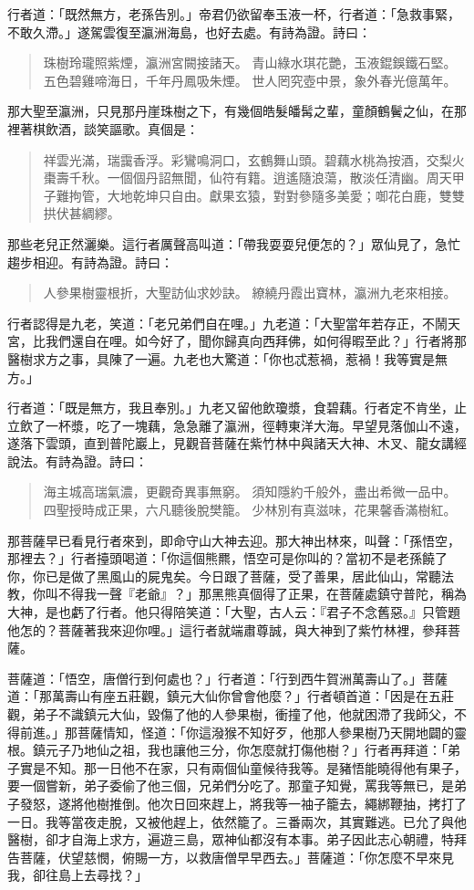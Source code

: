 行者道：「既然無方，老孫告別。」帝君仍欲留奉玉液一杯，行者道：「急救事緊，不敢久滯。」遂駕雲復至瀛洲海島，也好去處。有詩為證。詩曰：
\begin{quote}
珠樹玲瓏照紫煙，瀛洲宮闕接諸天。
青山綠水琪花艷，玉液錕鋘鐵石堅。
五色碧雞啼海日，千年丹鳳吸朱煙。
世人罔究壺中景，象外春光億萬年。
\end{quote}

那大聖至瀛洲，只見那丹崖珠樹之下，有幾個皓髮皤髯之輩，童顏鶴鬢之仙，在那裡著棋飲酒，談笑謳歌。真個是：
\begin{quote}
祥雲光滿，瑞靄香浮。彩鸞鳴洞口，玄鶴舞山頭。碧藕水桃為按酒，交梨火棗壽千秋。一個個丹詔無聞，仙符有籍。逍遙隨浪蕩，散淡任清幽。周天甲子難拘管，大地乾坤只自由。獻果玄猿，對對參隨多美愛；啣花白鹿，雙雙拱伏甚綢繆。
\end{quote}

那些老兒正然灑樂。這行者厲聲高叫道：「帶我耍耍兒便怎的？」眾仙見了，急忙趨步相迎。有詩為證。詩曰：
\begin{quote}
人參果樹靈根折，大聖訪仙求妙訣。
繚繞丹霞出寶林，瀛洲九老來相接。
\end{quote}

行者認得是九老，笑道：「老兄弟們自在哩。」九老道：「大聖當年若存正，不鬧天宮，比我們還自在哩。如今好了，聞你歸真向西拜佛，如何得暇至此？」行者將那醫樹求方之事，具陳了一遍。九老也大驚道：「你也忒惹禍，惹禍！我等實是無方。」

行者道：「既是無方，我且奉別。」九老又留他飲瓊漿，食碧藕。行者定不肯坐，止立飲了一杯漿，吃了一塊藕，急急離了瀛洲，徑轉東洋大海。早望見落伽山不遠，遂落下雲頭，直到普陀巖上，見觀音菩薩在紫竹林中與諸天大神、木叉、龍女講經說法。有詩為證。詩曰：
\begin{quote}
海主城高瑞氣濃，更觀奇異事無窮。
須知隱約千般外，盡出希微一品中。
四聖授時成正果，六凡聽後脫樊籠。
少林別有真滋味，花果馨香滿樹紅。
\end{quote}

那菩薩早已看見行者來到，即命守山大神去迎。那大神出林來，叫聲：「孫悟空，那裡去？」行者擡頭喝道：「你這個熊羆，悟空可是你叫的？當初不是老孫饒了你，你已是做了黑風山的屍鬼矣。今日跟了菩薩，受了善果，居此仙山，常聽法教，你叫不得我一聲『老爺』？」那黑熊真個得了正果，在菩薩處鎮守普陀，稱為大神，是也虧了行者。他只得陪笑道：「大聖，古人云：『君子不念舊惡。』只管題他怎的？菩薩著我來迎你哩。」這行者就端肅尊誠，與大神到了紫竹林裡，參拜菩薩。

菩薩道：「悟空，唐僧行到何處也？」行者道：「行到西牛賀洲萬壽山了。」菩薩道：「那萬壽山有座五莊觀，鎮元大仙你曾會他麼？」行者頓首道：「因是在五莊觀，弟子不識鎮元大仙，毀傷了他的人參果樹，衝撞了他，他就困滯了我師父，不得前進。」那菩薩情知，怪道：「你這潑猴不知好歹，他那人參果樹乃天開地闢的靈根。鎮元子乃地仙之祖，我也讓他三分，你怎麼就打傷他樹？」行者再拜道：「弟子實是不知。那一日他不在家，只有兩個仙童候待我等。是豬悟能曉得他有果子，要一個嘗新，弟子委偷了他三個，兄弟們分吃了。那童子知覺，罵我等無已，是弟子發怒，遂將他樹推倒。他次日回來趕上，將我等一袖子籠去，繩綁鞭抽，拷打了一日。我等當夜走脫，又被他趕上，依然籠了。三番兩次，其實難逃。已允了與他醫樹，卻才自海上求方，遍遊三島，眾神仙都沒有本事。弟子因此志心朝禮，特拜告菩薩，伏望慈憫，俯賜一方，以救唐僧早早西去。」菩薩道：「你怎麼不早來見我，卻往島上去尋找？」

